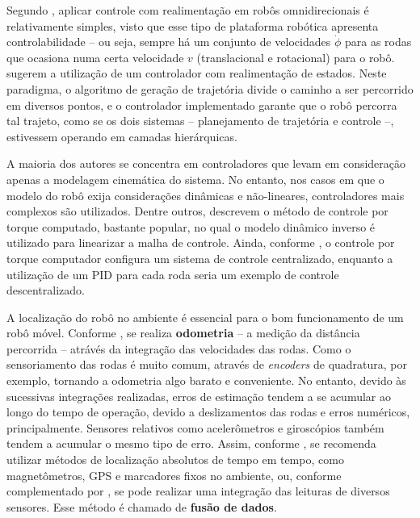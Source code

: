 Segundo \cite{lynch2017modern}, aplicar controle com realimentação em robôs omnidirecionais é relativamente simples, visto que esse tipo de plataforma robótica apresenta controlabilidade -- ou seja, sempre há um conjunto de velocidades \textbf{$\dot\phi$} para as rodas que ocasiona numa certa velocidade \textbf{$v$} (translacional e rotacional) para o robô. \cite{siegwart2011introduction} sugerem a utilização de um controlador com realimentação de estados. Neste paradigma, o algoritmo de geração de trajetória divide o caminho a ser percorrido em diversos pontos, e o controlador implementado garante que o robô percorra tal trajeto, como se os dois sistemas -- planejamento de trajetória e controle --, estivessem operando em camadas hierárquicas.

A maioria dos autores se concentra em controladores que levam em consideração apenas a modelagem cinemática do sistema. No entanto, nos casos em que o modelo do robô exija considerações dinâmicas e não-lineares, controladores mais complexos são utilizados. Dentre outros, \cite{siciliano2016springer} descrevem o método de controle por torque computado, bastante popular, no qual o modelo dinâmico inverso é utilizado para linearizar a malha de controle. Ainda, conforme \cite{indiveri2009swedish}, o controle por torque computador configura um sistema de controle centralizado, enquanto a utilização de um PID para cada roda seria um exemplo de controle descentralizado.

A localização do robô no ambiente é essencial para o bom funcionamento de um robô móvel. Conforme \cite{lynch2017modern}, se realiza \textbf{odometria} -- a medição da distância percorrida -- atrávés da integração das velocidades das rodas. Como o sensoriamento das rodas é muito comum, através de \textit{encoders} de quadratura, por exemplo, tornando a odometria algo barato e conveniente. No entanto, devido às sucessivas integrações realizadas, erros de estimação tendem a se acumular ao longo do tempo de operação, devido a deslizamentos das rodas e erros numéricos, principalmente. Sensores relativos como acelerômetros e giroscópios também tendem a acumular o mesmo tipo de erro. Assim, conforme \cite{siegwart2011introduction}, se recomenda utilizar métodos de localização absolutos de tempo em tempo, como magnetômetros, GPS e marcadores fixos no ambiente, ou, conforme complementado por \cite{lynch2017modern}, se pode realizar uma integração das leituras de diversos sensores. Esse método é chamado de \textbf{fusão de dados}.

